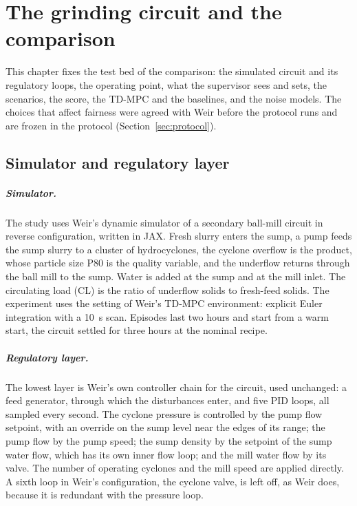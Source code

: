 \chapter{The grinding circuit and the comparison}
\label{ch:mill}
This chapter fixes the test bed of the comparison: the simulated circuit and
its regulatory loops, the operating point, what the supervisor sees and sets,
the scenarios, the score, the TD-MPC and the baselines, and the noise models.
The choices that affect fairness were agreed with Weir before the protocol
runs and are frozen in the protocol (Section~\ref{sec:protocol}).

\section{Simulator and regulatory layer}
\label{sec:mill-plant}
\paragraph{Simulator.} The study uses Weir's dynamic simulator of a
secondary ball-mill circuit in reverse configuration, written in JAX. Fresh
slurry enters the sump, a pump feeds the sump slurry to a cluster of
hydrocyclones, the cyclone overflow is the product, whose particle size P80 is
the quality variable, and the underflow returns through the ball mill to the
sump. Water is added at the sump and at the mill inlet. The circulating load
(CL) is the ratio of underflow solids to fresh-feed solids. The experiment
uses the setting of Weir's TD-MPC environment: explicit Euler integration with
a 10~s scan. Episodes last two hours and start from a warm start, the circuit
settled for three hours at the nominal recipe.

\paragraph{Regulatory layer.} The lowest layer is Weir's own controller chain
for the circuit, used unchanged: a feed generator, through which the
disturbances enter, and five PID loops, all sampled every second. The cyclone
pressure is controlled by the pump flow setpoint, with an override on the
sump level near the edges of its range; the pump flow by the pump speed; the
sump density by the setpoint of the sump water flow, which has its own inner
flow loop; and the mill water flow by its valve. The number of operating
cyclones and the mill speed are applied directly. A sixth loop in Weir's
configuration, the cyclone valve, is left off, as Weir does, because it is
redundant with the pressure loop.

